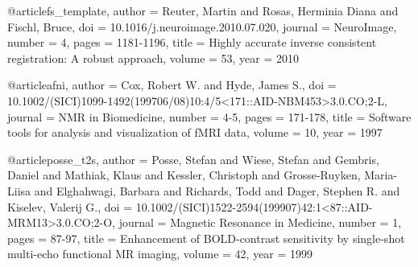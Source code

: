 @article{fs_template,
    author = {Reuter, Martin and Rosas, Herminia Diana and Fischl, Bruce},
    doi = {10.1016/j.neuroimage.2010.07.020},
    journal = {NeuroImage},
    number = 4,
    pages = {1181-1196},
    title = {Highly accurate inverse consistent registration: A robust approach},
    volume = 53,
    year = 2010
}

@article{afni,
    author = {Cox, Robert W. and Hyde, James S.},
    doi = {10.1002/(SICI)1099-1492(199706/08)10:4/5<171::AID-NBM453>3.0.CO;2-L},
    journal = {NMR in Biomedicine},
    number = {4-5},
    pages = {171-178},
    title = {Software tools for analysis and visualization of fMRI data},
    volume = 10,
    year = 1997
}

@article{posse_t2s,
    author = {Posse, Stefan and Wiese, Stefan and Gembris, Daniel and Mathiak, Klaus and Kessler, Christoph and Grosse-Ruyken, Maria-Liisa and Elghahwagi, Barbara and Richards, Todd and Dager, Stephen R. and Kiselev, Valerij G.},
    doi = {10.1002/(SICI)1522-2594(199907)42:1<87::AID-MRM13>3.0.CO;2-O},
    journal = {Magnetic Resonance in Medicine},
    number = 1,
    pages = {87-97},
    title = {Enhancement of {BOLD}-contrast sensitivity by single-shot multi-echo functional {MR} imaging},
    volume = 42,
    year = 1999
}